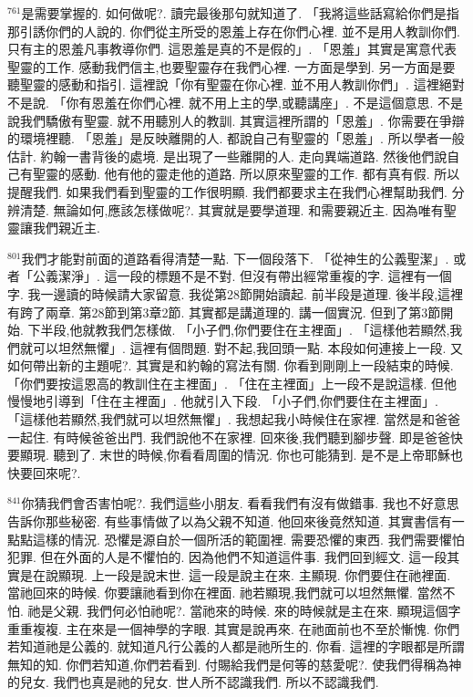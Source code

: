 \documentclass{book}
\begin{document}
$^{761}$是需要掌握的.
如何做呢?.
讀完最後那句就知道了.
「我將這些話寫給你們是指那引誘你們的人說的.
你們從主所受的恩羞上存在你們心裡.
並不是用人教訓你們.
只有主的恩羞凡事教導你們.
這恩羞是真的不是假的」.
「恩羞」其實是寓意代表聖靈的工作.
感動我們信主,也要聖靈存在我們心裡.
一方面是學到.
另一方面是要聽聖靈的感動和指引.
這裡說「你有聖靈在你心裡.
並不用人教訓你們」.
這裡絕對不是說.
「你有恩羞在你們心裡.
就不用上主的學,或聽講座」.
不是這個意思.
不是說我們驕傲有聖靈.
就不用聽別人的教訓.
其實這裡所謂的「恩羞」.
你需要在爭辯的環境裡聽.
「恩羞」是反映離開的人.
都說自己有聖靈的「恩羞」.
所以學者一般估計.
約翰一書背後的處境.
是出現了一些離開的人.
走向異端道路.
然後他們說自己有聖靈的感動.
他有他的靈走他的道路.
所以原來聖靈的工作.
都有真有假.
所以提醒我們.
如果我們看到聖靈的工作很明顯.
我們都要求主在我們心裡幫助我們.
分辨清楚.
無論如何,應該怎樣做呢?.
其實就是要學道理.
和需要親近主.
因為唯有聖靈讓我們親近主.

$^{801}$我們才能對前面的道路看得清楚一點.
下一個段落下.
「從神生的公義聖潔」.
或者「公義潔淨」.
這一段的標題不是不對.
但沒有帶出經常重複的字.
這裡有一個字.
我一邊讀的時候請大家留意.
我從第28節開始讀起.
前半段是道理.
後半段,這裡有跨了兩章.
第28節到第3章2節.
其實都是講道理的.
講一個實況.
但到了第3節開始.
下半段,他就教我們怎樣做.
「小子們,你們要住在主裡面」.
「這樣他若顯然,我們就可以坦然無懼」.
這裡有個問題.
對不起,我回頭一點.
本段如何連接上一段.
又如何帶出新的主題呢?.
其實是和約翰的寫法有關.
你看到剛剛上一段結束的時候.
「你們要按這恩高的教訓住在主裡面」.
「住在主裡面」上一段不是說這樣.
但他慢慢地引導到「住在主裡面」.
他就引入下段.
「小子們,你們要住在主裡面」.
「這樣他若顯然,我們就可以坦然無懼」.
我想起我小時候住在家裡.
當然是和爸爸一起住.
有時候爸爸出門.
我們說他不在家裡.
回來後,我們聽到腳步聲.
即是爸爸快要顯現.
聽到了.
末世的時候,你看看周圍的情況.
你也可能猜到.
是不是上帝耶穌也快要回來呢?.

$^{841}$你猜我們會否害怕呢?.
我們這些小朋友.
看看我們有沒有做錯事.
我也不好意思告訴你那些秘密.
有些事情做了以為父親不知道.
他回來後竟然知道.
其實書信有一點點這樣的情況.
恐懼是源自於一個所活的範圍裡.
需要恐懼的東西.
我們需要懼怕犯罪.
但在外面的人是不懼怕的.
因為他們不知道這件事.
我們回到經文.
這一段其實是在說顯現.
上一段是說末世.
這一段是說主在來.
主顯現.
你們要住在祂裡面.
當祂回來的時候.
你要讓祂看到你在裡面.
祂若顯現,我們就可以坦然無懼.
當然不怕.
祂是父親.
我們何必怕祂呢?.
當祂來的時候.
來的時候就是主在來.
顯現這個字重重複複.
主在來是一個神學的字眼.
其實是說再來.
在祂面前也不至於慚愧.
你們若知道祂是公義的.
就知道凡行公義的人都是祂所生的.
你看.
這裡的字眼都是所謂無知的知.
你們若知道,你們若看到.
付賜給我們是何等的慈愛呢?.
使我們得稱為神的兒女.
我們也真是祂的兒女.
世人所不認識我們.
所以不認識我們.
\end{document}
